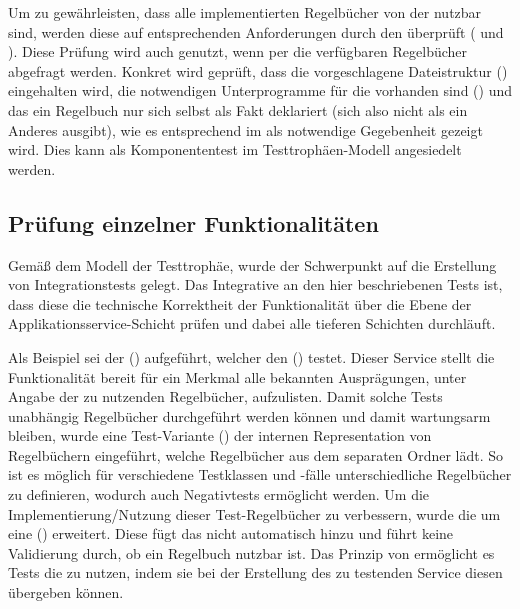 Um zu gewährleisten, dass alle implementierten Regelbücher von der  nutzbar sind, werden diese auf entsprechenden Anforderungen durch den  überprüft (\vgl {} und ).
Diese Prüfung wird auch genutzt, wenn per  die verfügbaren Regelbücher abgefragt werden.
Konkret wird geprüft, dass die vorgeschlagene Dateistruktur () eingehalten wird, die notwendigen Unterprogramme für die  vorhanden sind () und das ein Regelbuch nur sich selbst als Fakt deklariert (sich also nicht als ein Anderes ausgibt), wie es entsprechend im  als notwendige Gegebenheit gezeigt wird.
Dies kann als Komponententest im Testtrophäen-Modell angesiedelt werden.


\subsection{Prüfung einzelner Funktionalitäten}\label{subsec:prufung-einzelner-funktionalitaten}

Gemäß dem Modell der Testtrophäe, wurde der Schwerpunkt auf die Erstellung von Integrationstests gelegt.
Das Integrative an den hier beschriebenen Tests ist, dass diese die technische Korrektheit der Funktionalität über die Ebene der Applikationsservice-Schicht prüfen und dabei alle tieferen Schichten durchläuft.

Als Beispiel sei der  () aufgeführt, welcher den  () testet.
Dieser Service stellt \uA die Funktionalität bereit für ein Merkmal alle bekannten Ausprägungen, unter Angabe der zu nutzenden Regelbücher, aufzulisten.
Damit solche Tests unabhängig  Regelbücher durchgeführt werden können und damit wartungsarm bleiben, wurde eine Test-Variante () der internen Representation von Regelbüchern eingeführt, welche Regelbücher aus dem separaten  Ordner lädt.
So ist es möglich für verschiedene Testklassen und -fälle unterschiedliche Regelbücher zu definieren, wodurch auch Negativtests ermöglicht werden.
Um die Implementierung/Nutzung dieser Test-Regelbücher zu verbessern, wurde die  um eine  () erweitert.
Diese fügt das  nicht automatisch hinzu und führt keine Validierung durch, ob ein Regelbuch nutzbar ist.
Das Prinzip von  ermöglicht es Tests die  zu nutzen, indem sie bei der Erstellung des zu testenden Service diesen übergeben können.


